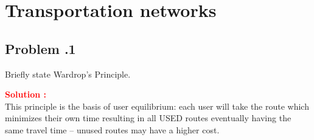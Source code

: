 \documentclass[12pt]{article}
\newcommand{\customsubsection}[1]{
  \subsection*{Problem \thesection.#1}
}
\begin{document}

\section{Transportation networks}

\customsubsection{1}
Briefly state Wardrop’s Principle. 


\textbf{\textcolor{red}{Solution :}} \\
This principle is the basis of user equilibrium: each user will take the route which minimizes their own time resulting in all USED routes eventually having the same travel time – unused routes may have a higher cost. 
\newpage
\end{document}
